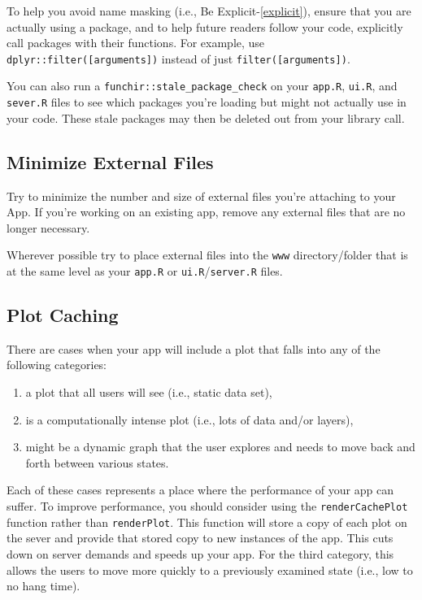 \documentclass[
]{book}
\providecommand{\tightlist}{%
  \setlength{\itemsep}{0pt}\setlength{\parskip}{0pt}}
\begin{document}
To help you avoid name masking (i.e., Be Explicit-\ref{explicit}), ensure that you are actually using a package, and to help future readers follow your code, explicitly call packages with their functions. For example, use \texttt{dplyr::filter({[}arguments{]})} instead of just \texttt{filter({[}arguments{]})}.

You can also run a \texttt{funchir::stale\_package\_check} on your \texttt{app.R}, \texttt{ui.R}, and \texttt{sever.R} files to see which packages you're loading but might not actually use in your code. These stale packages may then be deleted out from your library call.

\hypertarget{exFiles}{%
\subsection{Minimize External Files}\label{exFiles}}

Try to minimize the number and size of external files you're attaching to your App. If you're working on an existing app, remove any external files that are no longer necessary.

Wherever possible try to place external files into the \texttt{www} directory/folder that is at the same level as your \texttt{app.R} or \texttt{ui.R}/\texttt{server.R} files.

\hypertarget{plotCache}{%
\subsection{Plot Caching}\label{plotCache}}

There are cases when your app will include a plot that falls into any of the following categories:

\begin{enumerate}
\def\labelenumi{\arabic{enumi})}
\tightlist
\item
  a plot that all users will see (i.e., static data set),
\item
  is a computationally intense plot (i.e., lots of data and/or layers),
\item
  might be a dynamic graph that the user explores and needs to move back and forth between various states.
\end{enumerate}

Each of these cases represents a place where the performance of your app can suffer. To improve performance, you should consider using the \texttt{renderCachePlot} function rather than \texttt{renderPlot}. This function will store a copy of each plot on the sever and provide that stored copy to new instances of the app. This cuts down on server demands and speeds up your app. For the third category, this allows the users to move more quickly to a previously examined state (i.e., low to no hang time).
\end{document}
